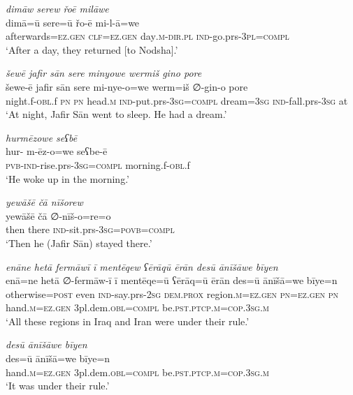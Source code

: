 \ea \label{ŠJ.42}
\textit{dimāw serew řoē milāwe} \\ 
\gll dimā=ū sere=ū řo-ē mi-l-ā=we \\ 
 afterwards\textsc{=ez.gen} \textsc{clf}\textsc{=ez.gen} day\textsc{.m}\textsc{-dir}\textsc{.pl} \textsc{ind-}go.prs\textsc{-3pl}\textsc{=compl} \\ 
\glt `After a day, they returned [to Nodsha].'
\z 
 
\ea \label{ŠJ.46}
\textit{šewē jafir sān sere minyowe wermiš gino pore} \\ 
\gll šewe-ē jafir sān sere mi-nye-o=we werm=iš ∅-gin-o pore \\ 
 night.f\textsc{-obl}.f \textsc{pn} \textsc{pn} head\textsc{.m} \textsc{ind-}put.prs\textsc{-3sg}\textsc{=compl} dream\textsc{=3sg} \textsc{ind-}fall.prs\textsc{-3sg} at \\ 
\glt `At night, Jafir Sān went to sleep. He had a dream.'
\z 
 
\ea \label{ŠJ.47}
\textit{hurmēzowe seʕbē} \\ 
\gll hur- m-ēz-o=we seʕbe-ē \\ 
 \textsc{pvb-}\textsc{ind-}rise.prs\textsc{-3sg}\textsc{=compl} morning.f\textsc{-obl}.f \\ 
\glt `He woke up in the morning.'
\z 
 
\ea \label{ŠJ.93}
\textit{yewāšē čā nīšorew} \\ 
\gll yewāšē čā ∅-nīš-o=re=o \\ 
 then there \textsc{ind-}sit.prs\textsc{-3sg}\textsc{=\textsc{povb}}\textsc{=compl} \\ 
\glt `Then he (Jafir Sān) stayed there.'
\z 
 
\ea \label{ŠJ.102}
\textit{enāne hetā fermāwī ī mentēqew ʕērāqū ērān desū ānīšāwe bīyen} \\ 
\gll enā=ne hetā ∅-fermāw-ī ī mentēqe=ū ʕērāq=ū ērān des=ū ānīšā=we bīye=n \\ 
 otherwise\textsc{=\textsc{post}} even \textsc{ind-}say.prs-\textsc{2sg} \textsc{dem.prox} region\textsc{.m}\textsc{=ez.gen} \textsc{pn}\textsc{=ez.gen} \textsc{pn} hand\textsc{.m}\textsc{=ez.gen} 3pl.dem\textsc{.obl}\textsc{=compl} be\textsc{.pst}\textsc{.ptcp}\textsc{.m}\textsc{=cop}\textsc{.3sg}\textsc{.m} \\ 
\glt `All these regions in Iraq and Iran were under their rule.'
\z 
 
\ea \label{ŠJ.103}
\textit{desū ānīšāwe bīyen} \\ 
\gll des=ū ānīšā=we bīye=n \\ 
 hand\textsc{.m}\textsc{=ez.gen} 3pl.dem\textsc{.obl}\textsc{=compl} be\textsc{.pst}\textsc{.ptcp}\textsc{.m}\textsc{=cop}\textsc{.3sg}\textsc{.m} \\ 
\glt `It was under their rule.'
\z 
 
